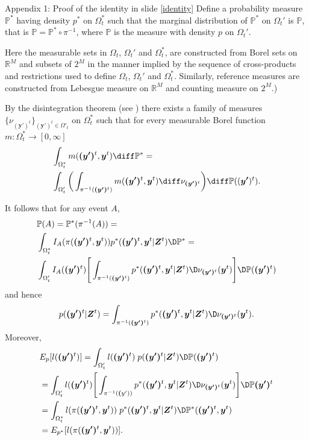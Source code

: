 \documentclass[9pt, xcolor={dvipsnames,svgnames,table}]{beamer}
\renewcommand{\P}{\mathbb{P}}
\newcommand{\Real}{\mathbb R}
\begin{document}
\begin{frame}{Appendix 1: Proof of the identity in slide \ref{identity}}
    Define a probability measure $\P^*$ having density $p^*$ on $\Omega^*_t$ such that the marginal distribution of $\P^*$ on $\Omega_t'$ is $\P$, that is $\P = \P^* \circ \pi^{-1}$, where $\P$ is the measure with density $p$ on $\Omega_t'$. 

    Here the measurable sets in $\Omega_t$, $\Omega_t'$ and $\Omega_t^*$, are constructed from Borel sets on $\Real^M$ and subsets of $2^M$ in the manner implied by the sequence of cross-products and restrictions used to define $\Omega_t$, $\Omega_t'$ and $\Omega_t^*$. Similarly, reference measures are constructed from Lebesgue measure on $\Real^M$ and counting measure on $2^M$.)

    By the disintegration theorem (see \cite{Rohlin}) there exists a family of measures $\{ \nu_{\bm{(y')}^t} \}_{\bm{(y')}^t \in \Omega'_t}$ on $\Omega^*_t$ such that for every measurable Borel function $m : \Omega^*_t \rightarrow [0, \infty]$
    \begin{align*}
        &\int_{\Omega^*_t} m(\bm{(y')}^t, \bm{y}^t)\diff \P^* = \\
     & \int_{\Omega_t'} \bigg( \int_{\pi^{-1}(\bm{(y')}^t)} m(\bm{(y')}^t, \bm{y}^t) \diff \nu_{\bm{(y')}^t}  \bigg) \diff \P((\bm{y'})^t).
    \end{align*}
\end{frame}



\begin{frame}
    It follows that for any event $A$,
    \begin{align*}
        &\P(A) = \P^{*}(\pi^{-1}(A)) = \\
        &\int_{\Omega_t^*} I_A(\pi(\bm{(y')}^t, \bm{y}^t)) p^*(\bm{(y')}^t, \bm{y}^t | \bm{Z}^t) \D \P^*  = \\
        & \int_{\Omega_t'} I_A(\bm{(y')}^t) \Bigg[ \int_{\pi^{-1}(\bm{(y')}^t)} p^*(\bm{(y')}^t, \bm{y}^t | \bm{Z}^t) \D \nu_{\bm{(y')}^t} (\bm{y}^t) \Bigg] \D \P (\bm{(y')}^t)
    \end{align*}
    and hence
    \begin{equation*}
        p(\bm{(y')}^t | \bm{Z}^t) = \int_{\pi^{-1}(\bm{(y')}^t)} p^*(\bm{(y')}^t, \bm{y}^t | \bm{Z}^t) \D \nu_{\bm{(y')}^t}(\bm{y}^t).
    \end{equation*}
    Moreover,
    \begin{align*}
        &E_{p}[l(\bm{(y')}^{t})]  = \int_{\Omega_t'} l(\bm{(y')}^{t})\; p(\bm{(y')}^{t} | \bm{Z}^{t}) \D \P (\bm{(y')}^{t}) \\
        &= \int_{\Omega_t'} l(\bm{(y')}^{t})\Bigg[\int_{\pi^{-1}(\bm(y'))} p^*(\bm{(y')}^{t}, \bm{y}^{t} | \bm{Z}^{t}) \D \nu_{\bm{(y')}^t}(\bm{y}^t) \Bigg] \D \P \bm{(y')}^{t} \\ 
        &= \int_{\Omega_t^*} l(\pi(\bm{(y')}^{t}, \bm{y}^{t}))\; p^*(\bm{(y')}^{t}, \bm{y}^{t} | \bm{Z}^{t}) \D \P^*(\bm{(y')}^t, \bm{y}^t) \\ 
        &= E_{p^*}[l(\pi (\bm{(y')}^{t}, \bm{y}^{t}))].
    \end{align*}
\end{frame}
\end{document}
